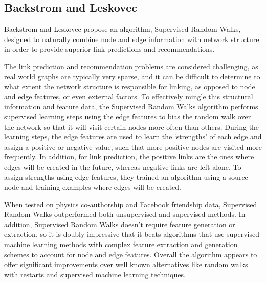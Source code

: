\subsection{Backstrom and Leskovec}

Backstrom and Leskovec propose an algorithm, Supervised Random Walks, designed
to naturally combine node and edge information with network structure in order
to provide superior link predictions and recommendations.

The link prediction and recommendation problems are considered challenging, as
real world graphs are typically very sparse, and it can be difficult to
determine to what extent the network structure is responsible for linking, as
opposed to node and edge features, or even external factors.  To effectively
mingle this structural information and feature data, the Supervised Random Walks
algorithm performs supervised learning steps using the edge features to bias the
random walk over the network so that it will  visit certain nodes more often
than others.  During the learning steps, the  edge features are used to learn
the `strengths' of each edge and assign a  positive or negative value, such that
more positive nodes are visited more  frequently.  In addition, for link
prediction, the positive links are the ones  where edges will be created in the
future, whereas negative links are left  alone.  To assign strengths using edge
features, they trained an algorithm  using a source node and training examples
where edges will be created.

When tested on physics co-authorship and Facebook friendship data, Supervised
Random Walks outperformed both unsupervised and supervised methods.  In
addition, Supervised Random Walks doesn't require feature generation or
extraction, so it is doubly impressive that it beats algorithms that use
supervised machine learning methods with complex feature extraction and
generation schemes to account for node and edge features. Overall the algorithm
appears to offer significant improvements over well known alternatives like
random walks with restarts and supervised machine learning techniques.

